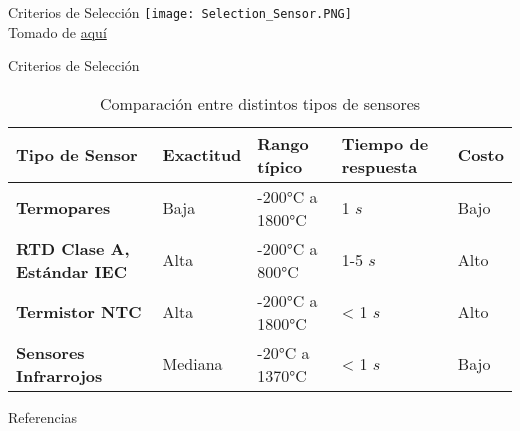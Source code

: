\documentclass[aspectratio=169]{beamer}
\begin{document}
\begin{frame}{Criterios de Selección}
    \centering
    \texttt{[image: Selection\_Sensor.PNG]}
            \\ \tiny{Tomado de \href{https://www.mechaterrain.com/lm35-temperature-sensor}{aquí}}
\end{frame}
\begin{frame}{Criterios de Selección}
  \begin{table}[]
    \centering
    \begin{tabular}{m{2cm} m{1.5cm} m{1.55cm} m{2cm} m{1.4cm}}
        \toprule
        \textbf{Tipo de Sensor} & \textbf{Exactitud} &\textbf{Rango típico} & \textbf{Tiempo de respuesta} & \textbf{Costo} \\
        \midrule
        \textbf{Termopares} & Baja & -200$\si{\celsius}$ a 1800$\si{\celsius}$ & 1 $s$ & Bajo\\
        \textbf{RTD Clase A, Estándar IEC} & Alta & -200$\si{\celsius}$ a 800$\si{\celsius}$ & 1-5 $s$ & Alto\\
        \textbf{Termistor NTC} & Alta & -200$\si{\celsius}$ a 1800$\si{\celsius}$ & < 1 $s$ & Alto\\
        \textbf{Sensores Infrarrojos} & Mediana & -20$\si{\celsius}$ a 1370$\si{\celsius}$ & < 1 $s$ & Bajo \\
        \bottomrule
    \end{tabular}
    \caption{Comparación entre distintos tipos de sensores}
    \label{tab:Comparacion}
\end{table}
\end{frame}
\begin{frame}{Referencias}

\footnotesize

\end{frame}
\end{document}
